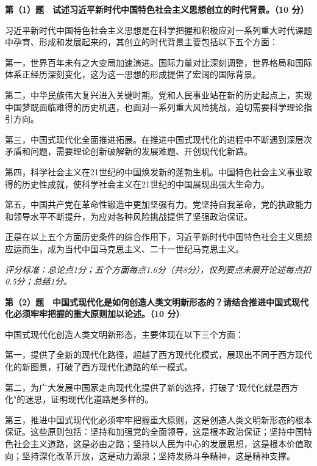 \documentclass[12pt, a4paper]{article}
\newcounter{bigq}
\newcommand{\BigQ}[1]{%
  \stepcounter{bigq}%
  \vspace{6pt}%
  \noindent{\large\bfseries 第\chinese{bigq}大题\quad #1}%
  \vspace{4pt}\par
}
\begin{document}
\BigQ{简答题参考答案}

\begin{answerbox}

\textbf{第（1）题　试述习近平新时代中国特色社会主义思想创立的时代背景。（10 分）}

习近平新时代中国特色社会主义思想是在科学把握和积极应对一系列重大时代课题中孕育、形成和发展起来的，其创立的时代背景主要包括以下五个方面：

第一，世界百年未有之大变局加速演进。国际力量对比深刻调整，世界格局和国际体系正经历深刻变化，这为这一思想的形成提供了宏阔的国际背景。

第二，中华民族伟大复兴进入关键时期。党和人民事业站在新的历史起点上，实现中国梦既面临难得的历史机遇，也面对一系列重大风险挑战，迫切需要科学理论指引方向。

第三，中国式现代化全面推进拓展。在推进中国式现代化的进程中不断遇到深层次矛盾和问题，需要理论创新破解新的发展难题、开创现代化新路。

第四，科学社会主义在21世纪的中国焕发新的蓬勃生机。中国特色社会主义事业取得的历史性成就，使科学社会主义在21世纪的中国展现出强大生命力。

第五，中国共产党在革命性锻造中更加坚强有力。党坚持自我革命，党的执政能力和领导水平不断提升，为应对各种风险挑战提供了坚强政治保证。

正是在以上五个方面历史条件的综合作用下，习近平新时代中国特色社会主义思想应运而生，成为当代中国马克思主义、二十一世纪马克思主义。

\textit{评分标准：总论点1分；五个方面每点1.6分（共8分），仅列要点未展开论述每点扣0.5分；总结1分。}

\vspace{6pt}
\textbf{第（2）题　中国式现代化是如何创造人类文明新形态的？请结合推进中国式现代化必须牢牢把握的重大原则加以论述。（10 分）}

中国式现代化创造人类文明新形态，主要体现在以下三个方面：

第一，提供了全新的现代化路径，超越了西方现代化模式，展现出不同于西方现代化的新图景，打破了西方现代化道路的单一模式。

第二，为广大发展中国家走向现代化提供了新的选择，打破了"现代化就是西方化"的迷思，证明现代化道路是多样的。

第三，推进中国式现代化必须牢牢把握重大原则，这是创造人类文明新形态的根本保证。这些原则包括：坚持和加强党的全面领导，这是根本政治保证；坚持中国特色社会主义道路，这是必由之路；坚持以人民为中心的发展思想，这是根本价值取向；坚持深化改革开放，这是动力源泉；坚持发扬斗争精神，这是精神支撑。


\end{answerbox}
\end{document}

